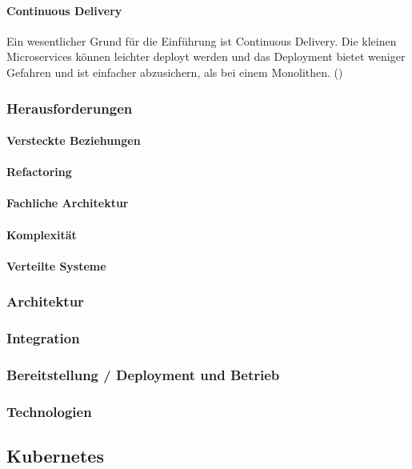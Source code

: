 \paragraph{Continuous Delivery}

Ein wesentlicher Grund für die Einführung ist Continuous Delivery. Die kleinen Microservices können leichter deployt werden und das Deployment bietet weniger Gefahren und ist einfacher abzusichern, als bei einem Monolithen. (\cite[S. 5]{wolffMicroservices2018})

\subsubsection{Herausforderungen}

\paragraph{Versteckte Beziehungen}

\paragraph{Refactoring}

\paragraph{Fachliche Architektur}

\paragraph{Komplexität}

\paragraph{Verteilte Systeme}

\subsubsection{Architektur}

\subsubsection{Integration}

\subsubsection{Bereitstellung / Deployment und Betrieb}

\subsubsection{Technologien}

\subsection{Kubernetes}
